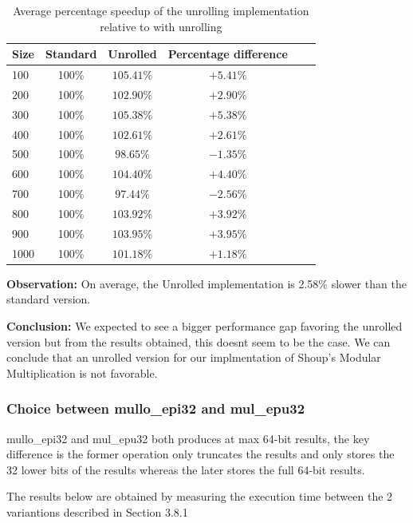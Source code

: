 \documentclass{article}
\begin{document}
\begin{table}[H]
    \centering
    \caption{Average percentage speedup of the unrolling implementation relative to with unrolling}
    \begin{tabular}{|l|c|c|c|c|c|}
        \hline
        Size & Standard & Unrolled   & Percentage difference \\ \hline
        100  & 100\%    & $105.41\%$ & $+5.41\%$             \\
        200  & 100\%    & $102.90\%$ & $+2.90\%$             \\
        300  & 100\%    & $105.38\%$ & $+5.38\%$             \\
        400  & 100\%    & $102.61\%$ & $+2.61\%$             \\
        500  & 100\%    & $98.65\%$  & $-1.35\%$             \\
        600  & 100\%    & $104.40\%$ & $+4.40\%$             \\
        700  & 100\%    & $97.44\%$  & $-2.56\%$             \\
        800  & 100\%    & $103.92\%$ & $+3.92\%$             \\
        900  & 100\%    & $103.95\%$ & $+3.95\%$             \\
        1000 & 100\%    & $101.18\%$ & $+1.18\%$             \\
        \hline
    \end{tabular}
\end{table}

\textbf{Observation: }On average, the Unrolled implementation is 2.58\% slower
than the standard version.

\textbf{Conclusion:} We expected to see a bigger performance gap favoring the unrolled version but from the results obtained, 
this doesnt seem to be the case. We can conclude that an unrolled version for our implmentation of Shoup's Modular Multiplication is not favorable.


\subsubsection{Choice between mullo\_epi32 and mul\_epu32}
mullo\_epi32 and mul\_epu32 both produces at max 64-bit results, the key difference is the former operation only truncates the results and only stores the
32 lower bits of the results whereas the later stores the full 64-bit results.

The results below are obtained by measuring the execution time between the 2 variantions described in Section 3.8.1
\end{document}
